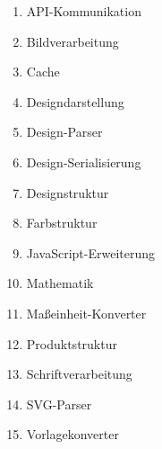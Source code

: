 \begin{enumerate}
    \item{API-Kommunikation}
    \item{Bildverarbeitung}
    \item{Cache}
    \item{Designdarstellung}
    \item{Design-Parser}
    \item{Design-Serialisierung}
    \item{Designstruktur}
    \item{Farbstruktur}
    \item{JavaScript-Erweiterung}
    \item{Mathematik}
    \item{Maßeinheit-Konverter}
    \item{Produktstruktur}
    \item{Schriftverarbeitung}
    \item{SVG-Parser}
    \item{Vorlagekonverter}
\end{enumerate}
